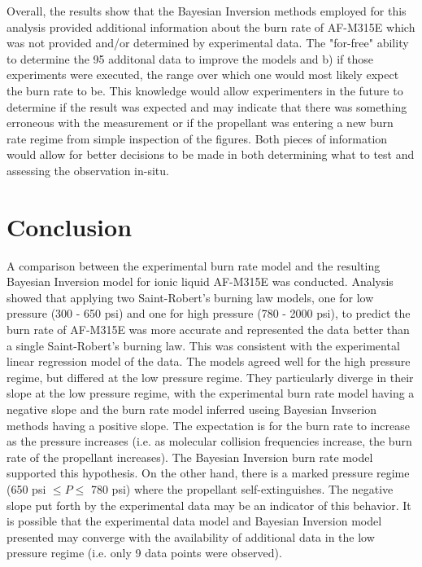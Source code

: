 \documentclass{article}
\begin{document}
Overall, the results show that the Bayesian Inversion methods employed for this analysis provided additional information
about the burn rate of AF-M315E which was not provided and/or determined by experimental data. The "for-free" ability to
determine the 95%
additonal data to improve the models and b) if those experiments were executed, the range over which one would most likely
expect the burn rate to be. This knowledge would allow experimenters in the future to determine if the result was expected
and may indicate that there was something erroneous with the measurement or if the propellant was entering a new burn rate
regime from simple inspection of the figures. Both pieces of information would allow for better decisions to be made in
both determining what to test and assessing the observation in-situ.

\section{Conclusion} \label{conclusion}

A comparison between the experimental burn rate model and the resulting Bayesian Inversion model for ionic liquid
AF-M315E was conducted. Analysis showed that applying two Saint-Robert's burning law models, one for low pressure
(300 - 650 psi) and one for high pressure (780 - 2000 psi), to predict the burn rate of AF-M315E was more accurate
and represented the data better than a single Saint-Robert's burning law. This was consistent with the experimental
linear regression model of the data. The models agreed well for the high pressure regime, but differed at the low
pressure regime. They particularly diverge in their slope at the low pressure regime, with the experimental burn
rate model having a negative slope and the burn rate model inferred useing Bayesian Invserion methods having a positive
slope. The expectation is for the burn rate to increase as the pressure increases (i.e. as molecular collision frequencies
increase, the burn rate of the propellant increases). The Bayesian Inversion burn rate model supported this hypothesis.
On the other hand, there is a marked pressure regime (650 psi $\leq P \leq$ 780 psi) where the propellant self-extinguishes.
The negative slope put forth by the experimental data may be an indicator of this behavior. It is possible that the
experimental data model and Bayesian Inversion model presented may converge with the availability of additional data
in the low pressure regime (i.e. only 9 data points were observed).

\nocite{*}


\end{document}
